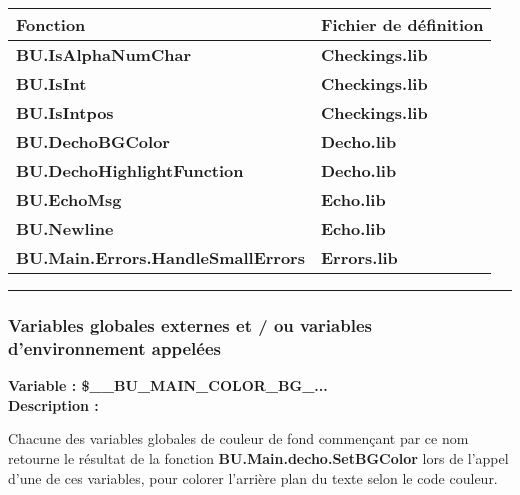 \documentclass[a4paper,10pt]{article}
\begin{document}
\begin{justify}
    \begin{tabular}{|l|l|}
        \hline
        \textbf{Fonction} & \textbf{Fichier de définition}\\
        \hline
        \textbf{\color{func}BU.IsAlphaNumChar}    & \textbf{\color{path}Checkings.lib}\\
        \hline
        \textbf{\color{func}BU.IsInt}             & \textbf{\color{path}Checkings.lib}\\
        \hline
        \textbf{\color{func}BU.IsIntpos}          & \textbf{\color{path}Checkings.lib}\\
        \hline
        \textbf{\color{func}BU.DechoBGColor}              & \textbf{\color{path}Decho.lib}\\
        \hline
        \textbf{\color{func}BU.DechoHighlightFunction}    & \textbf{\color{path}Decho.lib}\\
        \hline
        \textbf{\color{func}BU.EchoMsg}           & \textbf{\color{path}Echo.lib}\\
        \hline
        \textbf{\color{func}BU.Newline}           & \textbf{\color{path}Echo.lib}\\
        \hline
        \textbf{\color{func}BU.Main.Errors.HandleSmallErrors}   & \textbf{\color{path}Errors.lib}\\
        \hline
    \end{tabular}
\end{justify}

\setlength{\parskip}{2em}



\color{sec3}\par\noindent\rule{\textwidth}{0.4pt}\color{text}\setlength{\parskip}{1em}

\color{sec3}
\subsubsection{Variables globales externes et / ou variables d'environnement appelées}\color{text}

\textbf{Variable : \color{vars}\$\_\_BU\_MAIN\_COLOR\_BG\_...}\\[1\baselineskip]

\textbf{Description :}

\begin{justify}
    Chacune des variables globales de couleur de fond commençant par ce nom retourne le résultat de la fonction \textbf{\color{func}BU.Main.decho.SetBGColor} lors de l'appel d'une de ces variables, pour colorer l'arrière plan du texte selon le code couleur.
\end{justify}
\end{document}
